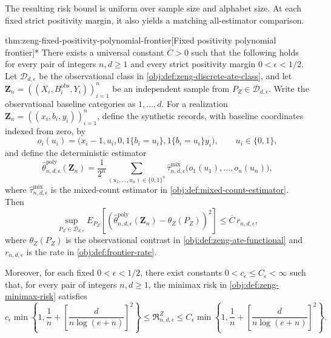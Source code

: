 \documentclass[11pt]{article}
\begin{document}
The resulting risk bound is uniform over sample size and alphabet size. At each fixed strict positivity margin, it also yields a matching all-estimator comparison.
\begin{theoremv}{thm:zeng-fixed-positivity-polynomial-frontier}[Fixed positivity polynomial frontier]*
There exists a universal constant \(\overline C>0\) such that the following holds for every pair of integers \(n,d\ge1\) and every strict positivity margin \(0<\epsilon<1/2\). Let \(\mathcal D_{d,\epsilon}\) be the observational class in \cref{obj:def:zeng-discrete-ate-class}, and let \(\mathbf Z_n=((X_i,B_i^{\mathrm{obs}},Y_i))_{i=1}^n\) be an independent sample from \(P_Z\in\mathcal D_{d,\epsilon}\). Write the observational baseline categories as \(1,\ldots,d\). For a realization \(\mathbf Z_n=((x_i,b_i,y_i))_{i=1}^n\), define the synthetic records, with baseline coordinates indexed from zero, by
\[
o_i(u_i)
=
\bigl(x_i-1,u_i,0,1\{b_i=u_i\},1\{b_i=u_i\}y_i\bigr),
\qquad u_i\in\{0,1\},
\]
and define the deterministic estimator
\[
\widehat\theta^{\mathrm{poly}}_{n,d,\epsilon}(\mathbf Z_n)
=
\frac{1}{2^n}
\sum_{(u_1,\ldots,u_n)\in\{0,1\}^n}
\widehat\tau^{\mathrm{mix}}_{n,d,\epsilon}
\bigl(o_1(u_1),\ldots,o_n(u_n)\bigr),
\]
where \(\widehat\tau^{\mathrm{mix}}_{n,d,\epsilon}\) is the mixed-count estimator in \cref{obj:def:mixed-count-estimator}. Then
\[
\sup_{P_Z\in\mathcal D_{d,\epsilon}}
E_{P_Z}\!\left[
\left(
\widehat\theta^{\mathrm{poly}}_{n,d,\epsilon}(\mathbf Z_n)
-\theta_Z(P_Z)
\right)^2
\right]
\le
\overline C\,r_{n,d,\epsilon},
\]
where \(\theta_Z(P_Z)\) is the observational contrast in \cref{obj:def:zeng-ate-functional} and \(r_{n,d,\epsilon}\) is the rate in \cref{obj:def:frontier-rate}.

Moreover, for each fixed \(0<\epsilon<1/2\), there exist constants \(0<c_\epsilon\le C_\epsilon<\infty\) such that, for every pair of integers \(n,d\ge1\), the minimax risk in \cref{obj:def:zeng-minimax-risk} satisfies
\[
c_\epsilon
\min\left\{
1,\frac1n+
\left[\frac{d}{n\log(e+n)}\right]^2
\right\}
\le
\mathfrak R^Z_{n,d,\epsilon}
\le
C_\epsilon
\min\left\{
1,\frac1n+
\left[\frac{d}{n\log(e+n)}\right]^2
\right\}.
\]
\end{theoremv}
\end{document}
